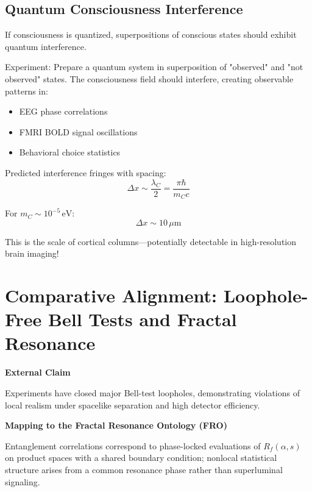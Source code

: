 \subsection{Quantum Consciousness Interference}

\begin{proposition}\label{prop:consciousness-interference}
If consciousness is quantized, superpositions of conscious states should exhibit quantum interference.

Experiment: Prepare a quantum system in superposition of "observed" and "not observed" states. The consciousness field should interfere, creating observable patterns in:
\begin{itemize}
\item EEG phase correlations\cite{buzsaki2012}
\item FMRI BOLD signal oscillations\cite{logothetis2001neurophysiological,ogawa1990}
\item Behavioral choice statistics
\end{itemize}

Predicted interference fringes with spacing:
\begin{equation}
\Delta x \sim \frac{\lambda_C}{2} = \frac{\pi \hbar}{m_C c}
\end{equation}

For $m_C \sim 10^{-5} \, \text{eV}$:
\begin{equation}
\Delta x \sim 10 \, \mu\text{m}
\end{equation}

This is the scale of cortical columns—potentially detectable in high-resolution brain imaging!
\end{proposition}

\section{Comparative Alignment: Loophole-Free Bell Tests and Fractal Resonance}

\textbf{External Claim}

Experiments have closed major Bell-test loopholes, demonstrating violations of local realism under spacelike separation and high detector efficiency.

\textbf{Mapping to the Fractal Resonance Ontology (FRO)}

Entanglement correlations correspond to phase-locked evaluations of $R_f(\alpha,s)$ on product spaces with a shared boundary condition; nonlocal statistical structure arises from a common resonance phase rather than superluminal signaling.

